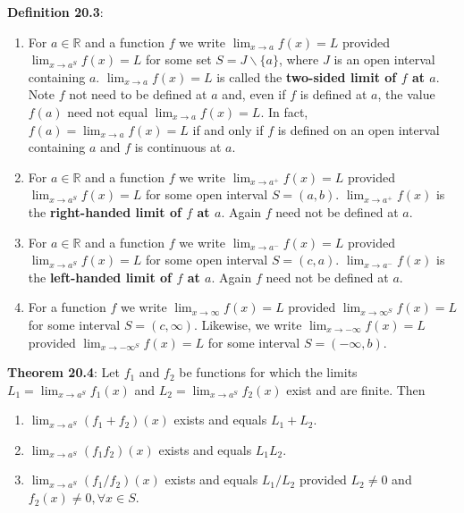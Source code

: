 \documentclass{article}
\theoremstyle{definition}
\begin{document}
\textbf{Definition 20.3}: \begin{enumerate}
    \item For $a \in \mathbb{R}$ and a function $f$ we write $\lim_{x \rightarrow a} f(x) = L$ provided $\lim_{x \rightarrow a^S} f(x) = L$ for some set $S = J \backslash \{a\}$, where $J$ is an open interval containing $a$. $\lim_{x \rightarrow a} f(x) = L$ is called the \textbf{two-sided limit of $f$ at $a$}. Note $f$ not need to be defined at $a$ and, even if $f$ is defined at $a$, the value $f(a)$ need not equal $\lim_{x \rightarrow a} f(x) = L$. In fact, $f(a) = \lim_{x \rightarrow a} f(x) = L$ if and only if $f$ is defined on an open interval containing $a$ and $f$ is continuous at $a$.
    \item For $a \in \mathbb{R}$ and a function $f$ we write $\lim_{x \rightarrow a^+} f(x) = L$ provided $\lim_{x \rightarrow a^S} f(x) = L$ for some open interval $S = (a, b)$. $\lim_{x \rightarrow a^+} f(x)$ is the \textbf{right-handed limit of $f$ at $a$}. Again $f$ need not be defined at $a$.
    \item For $a \in \mathbb{R}$ and a function $f$ we write $\lim_{x \rightarrow a^-} f(x) = L$ provided $\lim_{x \rightarrow a^S} f(x) = L$ for some open interval $S = (c, a)$. $\lim_{x \rightarrow a^-} f(x)$ is the \textbf{left-handed limit of $f$ at $a$}. Again $f$ need not be defined at $a$.
    \item For a function $f$ we write $\lim_{x \rightarrow \infty} f(x) = L$ provided $\lim_{x \rightarrow \infty^S} f(x) = L$ for some interval $S = (c, \infty)$. Likewise, we write $\lim_{x \rightarrow -\infty} f(x) = L$ provided $\lim_{x \rightarrow -\infty^S} f(x) = L$ for some interval $S = (-\infty, b)$.
\end{enumerate} $ $ \\
\textbf{Theorem 20.4}: Let $f_1$ and $f_2$ be functions for which the limits $L_1 = \lim_{x \rightarrow a^S} f_1(x)$ and $L_2 = \lim_{x \rightarrow a^S} f_2(x)$ exist and are finite. Then \begin{enumerate}
    \item $\lim_{x \rightarrow a^S} (f_1 + f_2)(x)$ exists and equals $L_1 + L_2$.
    \item $\lim_{x \rightarrow a^S} (f_1f_2)(x)$ exists and equals $L_1L_2$.
    \item $\lim_{x \rightarrow a^S} (f_1/f_2)(x)$ exists and equals $L_1/L_2$ provided $L_2 \neq 0$ and $f_2(x) \neq 0, \forall x \in S$.
\end{enumerate} $ $ \\
\end{document}
